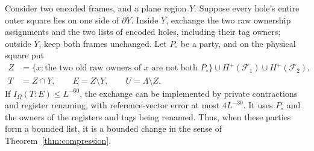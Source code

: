 \begin{lemma}\label{lem:exchange}
Consider two encoded frames, and a plane region $Y$.  Suppose every hole's
entire outer square lies on one side of $\partial Y$.  Inside $Y$, exchange
the two raw ownership assignments and the two lists of encoded holes,
including their tag owners; outside $Y$, keep both frames unchanged.
Let $P_\circ$ be a party, and on the physical square put
\begin{align}
 Z&=\{x:\text{the two old raw owners of }x
                         \text{ are not both }P_\circ\}
                  \cup H^+(\mathcal F_1)\cup H^+(\mathcal F_2),
                 \label{eq:exchange-Z}\\
 T&=Z\cap Y,\qquad E=Z\setminus Y,\qquad
 U=\Lambda\setminus Z.\label{eq:exchange-partition}
\end{align}
If $I_\Omega(T:E)\le L^{-60}$, the exchange can be implemented by private
contractions and register renaming, with reference-vector error at most
$4L^{-30}$.  It uses $P_\circ$ and the owners of the registers and tags
being renamed.  Thus, when these parties form a bounded list, it is a
bounded change in the sense of Theorem~\ref{thm:compression}.
\end{lemma}

